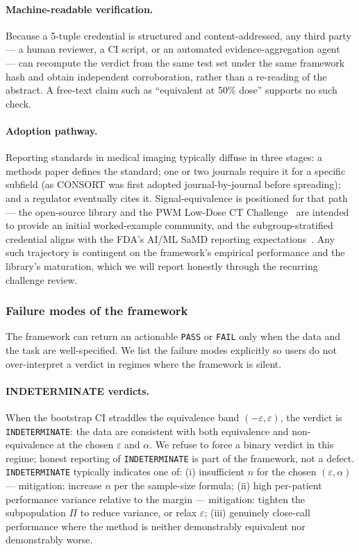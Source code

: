 \documentclass[twoside,11pt]{article}
\begin{document}
\paragraph{Machine-readable verification.} Because a 5-tuple credential is structured and content-addressed, any third party --- a human reviewer, a CI script, or an automated evidence-aggregation agent~\citep{anthropic_mcp_2024} --- can recompute the verdict from the same test set under the same framework hash and obtain independent corroboration, rather than a re-reading of the abstract. A free-text claim such as ``equivalent at 50\% dose'' supports no such check.

\paragraph{Adoption pathway.} Reporting standards in medical imaging typically diffuse in three stages: a methods paper defines the standard; one or two journals require it for a specific subfield (as CONSORT was first adopted journal-by-journal before spreading); and a regulator eventually cites it. Signal-equivalence is positioned for that path --- the open-source library and the PWM Low-Dose CT Challenge~\citep{ws4leaderboard} are intended to provide an initial worked-example community, and the subgroup-stratified credential aligns with the FDA's AI/ML SaMD reporting expectations~\citep{fda_aiml_2024}. Any such trajectory is contingent on the framework's empirical performance and the library's maturation, which we will report honestly through the recurring challenge review.

\subsubsection*{Failure modes of the framework}
\label{sec:failure_modes}

The framework can return an actionable \texttt{PASS} or \texttt{FAIL} only when the data and the task are well-specified. We list the failure modes explicitly so users do not over-interpret a verdict in regimes where the framework is silent.

\paragraph{INDETERMINATE verdicts.} When the bootstrap CI straddles the equivalence band $(-\varepsilon, \varepsilon)$, the verdict is \texttt{INDETERMINATE}: the data are consistent with both equivalence and non-equivalence at the chosen $\varepsilon$ and $\alpha$. We refuse to force a binary verdict in this regime; honest reporting of \texttt{INDETERMINATE} is part of the framework, not a defect. \texttt{INDETERMINATE} typically indicates one of: (i) insufficient $n$ for the chosen $(\varepsilon, \alpha)$ --- mitigation: increase $n$ per the sample-size formula; (ii) high per-patient performance variance relative to the margin --- mitigation: tighten the subpopulation $\Pi$ to reduce variance, or relax $\varepsilon$; (iii) genuinely close-call performance where the method is neither demonstrably equivalent nor demonstrably worse.
\end{document}
